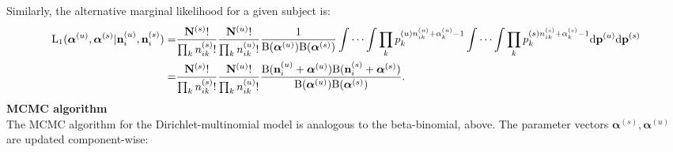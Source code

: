 \documentclass{article}
\begin{document}
\noindent Similarly, the alternative marginal likelihood for a given subject is:
\[
\begin{split}
\mathrm{L_1}(\boldsymbol{\alpha}^{(u)},\boldsymbol{\alpha}^{(s)}|\mathbf{n}^{(u)}_{i},\mathbf{n}^{(s)}_{i})
=&\frac{\mathbf{N}^{(s)}!}{\prod_k {n}^{(s)}_{ik}!}\frac{\mathbf{N}^{(u)}!}{\prod_k {n}^{(u)}_{ik}!}\frac{1}{\mathrm{B}(\boldsymbol{\alpha}^{(u)})\mathrm{B}(\boldsymbol{\alpha}^{(s)})}\idotsint\prod_k p^{(u)n^{(u)}_{ik}+\alpha^{(u)}_{k}-1}_{k}\idotsint \prod_k p^{(s)n^{(s)}_{ik}+\alpha^{(s)}_{k}-1}_{k}\mathrm{d}\mathbf{p}^{(u)}\mathrm{d}\mathbf{p}^{(s)}\\
=&\frac{\mathbf{N}^{(s)}!}{\prod_k {n}^{(s)}_{ik}!}\frac{\mathbf{N}^{(u)}!}{\prod_k {n}^{(u)}_{ik}!}\frac{\mathrm{B}(\mathbf{n}^{(u)}_{i}+\boldsymbol{\alpha}^{(u)})\mathrm{B}(\mathbf{n}^{(s)}_{i}+\boldsymbol{\alpha}^{(s)})}{\mathrm{B}(\boldsymbol{\alpha}^{(u)})\mathrm{B}(\boldsymbol{\alpha}^{(s)})}.
\end{split}
\]
\noindent\textbf{MCMC algorithm}\\
The MCMC algorithm for the Dirichlet-multinomial model is analogous to the beta-binomial, above. The parameter vectors $\boldsymbol{\alpha}^{(s)},\boldsymbol{\alpha}^{(u)}$ are updated component-wise:
\end{document}
